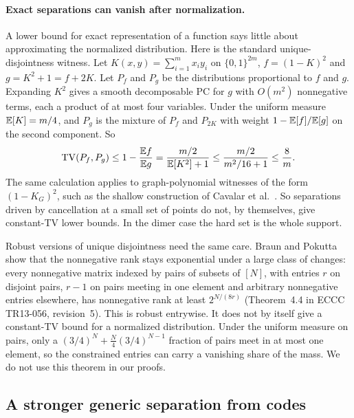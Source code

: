 \paragraph{Exact separations can vanish after normalization.} A lower bound for exact representation of a function says little about approximating the normalized distribution. Here is the standard unique-disjointness witness. Let $K(x,y)=\sum_{i=1}^mx_iy_i$ on $\{0,1\}^{2m}$, $f=(1-K)^2$ and $g=K^2+1=f+2K$. Let $P_f$ and $P_g$ be the distributions proportional to $f$ and $g$. Expanding $K^2$ gives a smooth decomposable PC for $g$ with $O(m^2)$ nonnegative terms, each a product of at most four variables. Under the uniform measure $\mathbb{E}[K]=m/4$, and $P_g$ is the mixture of $P_f$ and $P_{2K}$ with weight $1-\mathbb{E}[f]/\mathbb{E}[g]$ on the second component. So
\[
  \mathrm{TV}(P_f,P_g)\le1-\frac{\mathbb{E} f}{\mathbb{E} g}=\frac{m/2}{\mathbb{E}[K^2]+1}\le\frac{m/2}{m^2/16+1}\le\frac8m .
\]
The same calculation applies to graph-polynomial witnesses of the form $(1-K_G)^2$, such as the shallow construction of Cavalar et al.~\cite{CavalarFabrisEtAl25}. So separations driven by cancellation at a small set of points do not, by themselves, give constant-TV lower bounds. In the dimer case the hard set is the whole support.

Robust versions of unique disjointness need the same care. Braun and Pokutta~\cite{BraunPokutta16} show that the nonnegative rank stays exponential under a large class of changes: every nonnegative matrix indexed by pairs of subsets of $[N]$, with entries $r$ on disjoint pairs, $r-1$ on pairs meeting in one element and arbitrary nonnegative entries elsewhere, has nonnegative rank at least $2^{N/(8r)}$ (Theorem~4.4 in ECCC TR13-056, revision~5). This is robust entrywise. It does not by itself give a constant-TV bound for a normalized distribution. Under the uniform measure on pairs, only a $(3/4)^N+\tfrac N4(3/4)^{N-1}$ fraction of pairs meet in at most one element, so the constrained entries can carry a vanishing share of the mass. We do not use this theorem in our proofs.

\subsection{A stronger generic separation from codes}\label{sec:codes}

